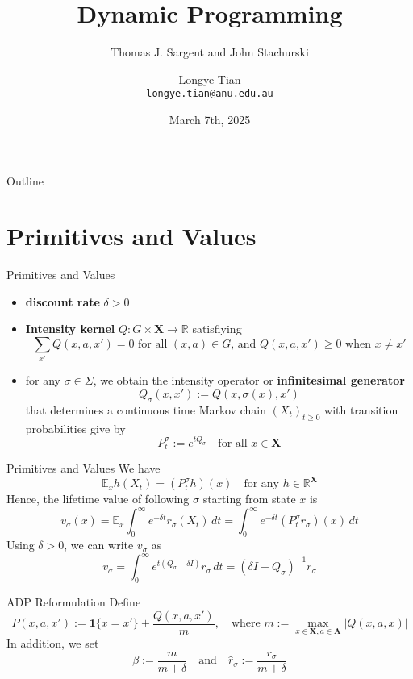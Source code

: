 \documentclass[aspectratio=169]{beamer} %
\title[DP2]{Dynamic Programming}
\subtitle{Thomas J. Sargent and John Stachurski}
\author[Longye]{Longye Tian \\ \texttt{longye.tian@anu.edu.au}}
\institute[ANU]{Australian National University\\ School of Economics}
\date{March 7th, 2025}
\begin{document}
\begin{frame}
  \titlepage
\end{frame}

\begin{frame}{Outline}
  \tableofcontents
\end{frame}
\section{Primitives and Values}
\begin{frame}{Primitives and Values}
\begin{itemize}
    \item \textbf{discount rate} $\delta>0$
    \item \textbf{Intensity kernel} $Q: G\times \mathbf{X}\to \mathbb{R}$ satisfiying
    $$
    \sum_{x'} Q(x,a,x') = 0 \,\,\text{for all $(x,a)\in G$, and $Q(x,a,x')\ge 0$ when $x\neq x'$}
    $$
    \item for any $\sigma\in\Sigma$, we obtain the intensity operator or \textbf{infinitesimal generator}
    $$
    Q_\sigma(x,x'):= Q(x,\sigma(x),x')
    $$
    that determines a continuous time Markov chain $(X_t)_{t\ge 0}$ with transition probabilities give by 
    $$
    P^\sigma_t:= e^{tQ_\sigma}  \quad \text{for all $x\in\mathbf{X}$}
    $$
\end{itemize}
    
\end{frame}

\begin{frame}{Primitives and Values}
We have
$$
\mathbb{E}_x h(X_t) = (P_t^\sigma h)(x) \quad\text{for any $h\in\mathbb{R}^{\mathbf{X}}$}
$$
Hence, the lifetime value of following $\sigma$ starting from state $x$ is
$$
v_\sigma(x) = \mathbb{E}_x\int_0^\infty e^{-\delta t} r_\sigma(X_t) \, dt = \int_0^\infty e^{-\delta t}(P^\sigma_t r_\sigma)(x)\, dt
$$
Using $\delta>0$, we can write $v_\sigma$ as
$$
v_\sigma  = \int_0^\infty e^{t(Q_\sigma -\delta I)}r_\sigma\, dt = (\delta I -Q_\sigma)^{-1} r_\sigma
$$
    
\end{frame}
\begin{frame}{ADP Reformulation}
Define
$$
P(x,a,x') :=\mathbf{1}\{x=x'\} + \frac{Q(x,a,x')}{m},\quad \text{where $m:=\max_{x\in\mathbf{X}, a\in\mathbf{A}} |Q(x,a,x)|$}
$$
In addition, we set
$$
\beta:= \frac{m}{m+\delta}\quad \text{and} \quad \hat{r}_\sigma := \frac{r_\sigma}{m+\delta}
$$
\end{frame}
\end{document}
